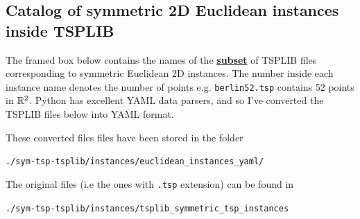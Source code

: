 \newpage
\begin{appendices}
\renewcommand{\thesection}{\Alph{section}}


\section{Catalog of symmetric 2D Euclidean instances inside TSPLIB}

The framed box below contains the names of the \textbf{\underline{subset}} of TSPLIB files corresponding to symmetric Euclidean 2D instances. 
The number inside each instance name denotes the number of points e.g. \verb|berlin52.tsp| contains 52 points in $\mathbb{R}^2$. 
Python has excellent YAML data parsers, and so I've converted the TSPLIB files below into YAML format. 

These converted files files have been stored in the folder


\begin{displayquote}
\color{blue} \Large
\begin{center}
\texttt{./sym-tsp-tsplib/instances/euclidean\_instances\_yaml/}
\end{center}
\end{displayquote}

The original files (i.e the ones with \verb|.tsp| extension) can be found in 

\begin{displayquote}
\begin{center}
\texttt{./sym-tsp-tsplib/instances/tsplib\_symmetric\_tsp\_instances}
\end{center}
\end{displayquote}


\end{appendices}
